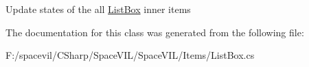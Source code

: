 Update states of the all \mbox{\hyperlink{class_space_v_i_l_1_1_list_box}{List\+Box}} inner items 



The documentation for this class was generated from the following file\+:\begin{DoxyCompactItemize}
\item 
F\+:/spacevil/\+C\+Sharp/\+Space\+V\+I\+L/\+Space\+V\+I\+L/\+Items/List\+Box.\+cs\end{DoxyCompactItemize}
